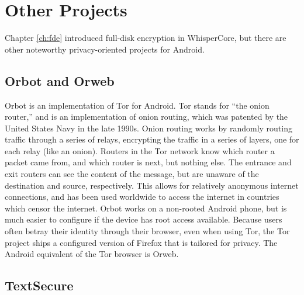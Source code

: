 \section{Other Projects}

Chapter \ref{ch:fde} introduced full-disk encryption in WhisperCore, but there are other noteworthy privacy-oriented projects for Android. 

\subsection{Orbot and Orweb}

Orbot is an implementation of Tor for Android. Tor stands for ``the onion router,'' and is an implementation of onion routing,
which was patented by the United States Navy in the late 1990s.  Onion routing works by randomly routing traffic through a series of
relays, encrypting the traffic in a series of layers, one for each relay (like an onion). Routers in the Tor network know which
router a packet came from, and which router is next, but nothing else. The entrance and exit routers can see the content of the
message, but are unaware of the destination and source, respectively. This allows for relatively anonymous internet connections, and
has been used worldwide to access the internet in countries which censor the internet. Orbot works on a non-rooted Android phone,
but is much easier to configure if the device has root access available. Because users often betray their identity through their
browser, even when using Tor, the Tor project ships a configured version of Firefox that is tailored for privacy. The Android
equivalent of the Tor browser is Orweb.


\subsection{TextSecure}

